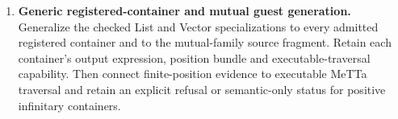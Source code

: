\documentclass[11pt,a4paper]{article}
\theoremstyle{plain}
\theoremstyle{definition}
\theoremstyle{remark}
\begin{document}
\begin{enumerate}
  Instantiate the four-outcome service and acceptance-refinement interfaces
  with a pinned external checker and export format. Bind parser, declaration
  stream, checker mode, semantic assumptions and runtime artifact in one
  release receipt. Prove the selected elaboration/reconstruction route into
  that checker, and keep official-kernel parity, model soundness and
  computational adequacy as distinct edges. Generalize the current
  finite-catalog exact node to declarations, inductive installation,
  quotients, primitives and the complete typed checker.
\item \textbf{Generic registered-container and mutual guest generation.}
  Generalize the checked List and Vector specializations to every admitted
  registered container and to the mutual-family source fragment. Retain each
  container's output expression, position bundle and executable-traversal
  capability. Then connect finite-position evidence to executable MeTTa
  traversal and retain an explicit refusal or semantic-only status for positive
  infinitary containers.
\end{enumerate}
\end{document}
